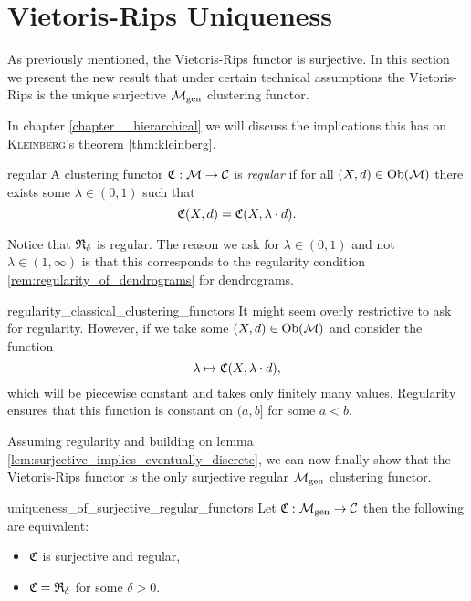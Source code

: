 \section[Vietoris-Rips Uniqueness]{Vietoris-Rips Uniqueness \newresult[]}

As previously mentioned, the Vietoris-Rips functor is surjective.
In this section we present the new result that under certain technical assumptions the Vietoris-Rips is the unique surjective ${\mathcal{M}_\mathrm{gen}}$ clustering functor.

In chapter \ref{chapter__hierarchical} we will discuss the implications this has on \textsc{Kleinberg}'s theorem \ref{thm:kleinberg}.

\begin{definition}{}{regular}
    A clustering functor $\mathfrak{C}: \mathcal{M} \to \mathcal{C}$ is \emph{regular} if for all $(X,d) \in \mathrm {Ob}(\mathcal{M})$ there exists some $\lambda \in (0, 1)$ such that
    $$
    \mathfrak{C}(X,d) = \mathfrak{C}(X, \lambda \cdot d).
    $$
    
\end{definition}

Notice that $\mathfrak{R}_\delta$ is regular. The reason we ask for $\lambda \in (0,1)$ and not $\lambda \in (1, \infty)$ is that this corresponds to the regularity condition \ref{rem:regularity_of_dendrograms} for dendrograms.\par

\begin{myremark}{}{regularity_classical_clustering_functors}
    \medskip It might seem overly restrictive to ask for regularity.
    However, if we take some $(X, d) \in \mathrm {Ob}(\mathcal{M})$ and consider the function 
    $$
    \lambda \mapsto \mathfrak{C}(X, \lambda \cdot d),
    $$
    which will be piecewise constant and takes only finitely many values.
    Regularity ensures that this function is constant on $(a, b]$ for some $a < b$.
\end{myremark}

Assuming regularity and building on lemma \ref{lem:surjective_implies_eventually_discrete}, we can now finally show that the Vietoris-Rips functor is the only surjective regular ${\mathcal{M}_\mathrm{gen}}$ clustering functor.

\begin{theorem}{}{uniqueness_of_surjective_regular_functors}
    Let $\mathfrak{C}: {\mathcal{M}_\mathrm{gen}} \to \mathcal{C}$ then the following are equivalent:

    \begin{itemize}
        \item $\mathfrak{C}$ is surjective and regular,
        \item $\mathfrak{C} = \mathfrak{R}_{\delta}$ for some $\delta > 0$.
    \end{itemize}
\end{theorem}

